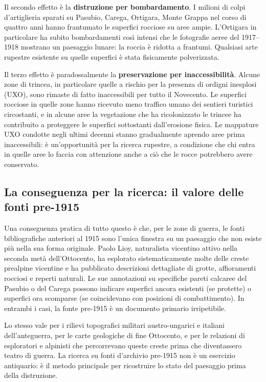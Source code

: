 Il secondo effetto è la \textbf{distruzione per bombardamento}. I milioni di colpi d'artiglieria sparati su Pasubio, Carega, Ortigara, Monte Grappa nel corso di quattro anni hanno frantumato le superfici rocciose su aree ampie. L'Ortigara in particolare ha subito bombardamenti così intensi che le fotografie aeree del 1917--1918 mostrano un paesaggio lunare: la roccia è ridotta a frantumi. Qualsiasi arte rupestre esistente su quelle superfici è stata fisicamente polverizzata.

Il terzo effetto è paradossalmente la \textbf{preservazione per inaccessibilità}. Alcune zone di trincea, in particolare quelle a rischio per la presenza di ordigni inesplosi (UXO), sono rimaste di fatto inaccessibili per tutto il Novecento. Le superfici rocciose in quelle zone hanno ricevuto meno traffico umano dei sentieri turistici circostanti, e in alcune aree la vegetazione che ha ricolonizzato le trincee ha contribuito a proteggere le superfici sottostanti dall'erosione fisica. Le mappature UXO condotte negli ultimi decenni stanno gradualmente aprendo aree prima inaccessibili: è un'opportunità per la ricerca rupestre, a condizione che chi entra in quelle aree lo faccia con attenzione anche a ciò che le rocce potrebbero avere conservato.

\subsection{La conseguenza per la ricerca: il valore delle fonti pre-1915}

Una conseguenza pratica di tutto questo è che, per le zone di guerra, le fonti bibliografiche anteriori al 1915 sono l'unica finestra su un paesaggio che non esiste più nella sua forma originale. Paolo Lioy, naturalista vicentino attivo nella seconda metà dell'Ottocento, ha esplorato sistematicamente molte delle creste prealpine vicentine e ha pubblicato descrizioni dettagliate di grotte, affioramenti rocciosi e reperti naturali. Le sue annotazioni su specifiche pareti calcaree del Pasubio o del Carega possono indicare superfici ancora esistenti (se protette) o superfici ora scomparse (se coincidevano con posizioni di combattimento). In entrambi i casi, la fonte pre-1915 è un documento primario irripetibile.

Lo stesso vale per i rilievi topografici militari austro-ungarici e italiani dell'anteguerra, per le carte geologiche di fine Ottocento, e per le relazioni di esploratori e alpinisti che percorrevano queste creste prima che diventassero teatro di guerra. La ricerca su fonti d'archivio pre-1915 non è un esercizio antiquario: è il metodo principale per ricostruire lo stato del paesaggio prima della distruzione.

